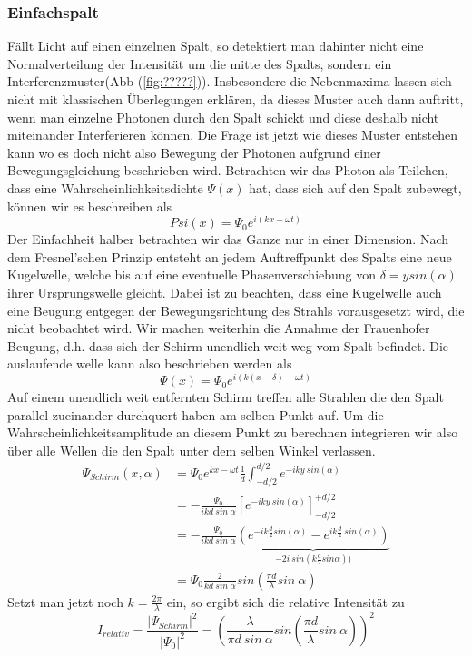 \documentclass[]{article}
\begin{document}
\subsubsection{Einfachspalt}
Fällt Licht auf einen einzelnen Spalt, so detektiert man dahinter nicht eine Normalverteilung der Intensität um die mitte des Spalts, sondern ein Interferenzmuster(Abb (\ref{fig:?????})). Insbesondere die Nebenmaxima lassen sich nicht mit klassischen Überlegungen erklären, da dieses Muster auch dann auftritt, wenn man einzelne Photonen durch den Spalt schickt und diese deshalb nicht miteinander Interferieren können.%
Die Frage ist jetzt wie dieses Muster entstehen kann wo es doch nicht also Bewegung der Photonen aufgrund einer Bewegungsgleichung beschrieben wird. Betrachten wir das Photon als Teilchen, dass eine Wahrscheinlichkeitsdichte $\Psi(x)$ hat, dass sich auf den Spalt zubewegt, können wir es beschreiben als 
\begin{equation}
	Psi(x)=\Psi_{0}e^{i(kx-\omega t)}
\end{equation}
Der Einfachheit halber betrachten wir das Ganze nur in einer Dimension. Nach dem Fresnel'schen Prinzip entsteht an jedem Auftreffpunkt des Spalts eine neue Kugelwelle, welche bis auf eine eventuelle Phasenverschiebung von $\delta =y sin(\alpha) $ ihrer Ursprungswelle gleicht. Dabei ist zu beachten, dass eine Kugelwelle auch eine Beugung entgegen der Bewegungsrichtung des Strahls vorausgesetzt wird, die nicht beobachtet wird. Wir machen weiterhin die Annahme der Frauenhofer Beugung, d.h. dass sich der Schirm unendlich weit weg vom Spalt befindet. Die auslaufende welle kann also beschrieben werden als
\begin{equation}
	\Psi(x)=\Psi_{0}e^{i(k(x-\delta)-\omega t)}
\end{equation}
Auf einem unendlich weit entfernten Schirm treffen alle Strahlen die den Spalt parallel zueinander durchquert haben am selben Punkt auf. Um die Wahrscheinlichkeitsamplitude an diesem Punkt zu berechnen integrieren wir also über alle Wellen die den Spalt unter dem selben Winkel verlassen.
\begin{align}%
	\Psi_{Schirm}(x,\alpha)&=\Psi_{0}e^{kx-\omega t}\frac{1}{d}\int_{-d/2}^{d/2} e^{-iky\: sin(\alpha)}  \\ 
	&=-\frac{\Psi_{0}}{ikd \: sin \: \alpha} [e^{-iky \: sin(\alpha)}]^{+d/2}_{-d/2} \\
	&=-\frac{\Psi_{0}}{ikd \: sin \: \alpha} \underbrace{(e^{-ik\frac{d}{2}sin(\alpha)}-e^{ik\frac{d}{2}\:sin(\alpha)})}_{-2i\: sin(k\frac{d}{2}sin \alpha))} \\
	&=\Psi_{0}\frac{2}{kd\: sin \: \alpha}sin(\frac{\pi d}{\lambda}sin \: \alpha) 
\end{align}
Setzt man jetzt noch $k=\frac{2\pi}{\lambda}$ ein, so ergibt sich die relative Intensität zu
\begin{equation}
I_{relativ}=	\frac{|\Psi_{Schirm}|^2}{|\Psi_{0}|^2}=(\frac{\lambda}{\pi d \: sin \: \alpha} sin(\frac{\pi d}{\lambda} sin \: \alpha))^2
\end{equation}
\end{document}
